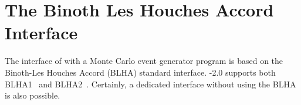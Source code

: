 %

\chapter{The Binoth Les Houches Accord Interface}
\label{sec:blha}


The interface of \gosam{} with a Monte Carlo event generator program 
is based on the Binoth-Les Houches Accord (BLHA)
standard interface.
\gosam{}-2.0 supports both BLHA1~\cite{Binoth:2010xt}
and BLHA2~\cite{Alioli:2013nda}.
Certainly, a dedicated interface without using the BLHA is also possible.



